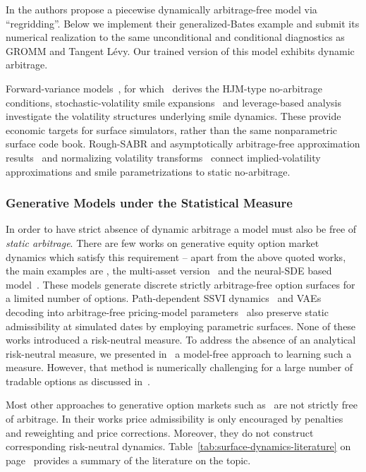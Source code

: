 \documentclass[smallextended,envcountsame,envcountsect]{svjour3}
\begin{document}
In \citet{DysLitGambaraTeichmann2021} the authors propose a piecewise
dynamically arbitrage-free model via ``regridding''.  Below we implement their
generalized-Bates example and submit its numerical realization to the same
unconditional and conditional diagnostics as GROMM and Tangent L\'evy. Our trained version of this
model exhibits dynamic arbitrage.

Forward-variance models~\citep{DysLitBergomi2005,bergomi2008smile}, for which~\citet{buehler2006consistent} derives the HJM-type no-arbitrage conditions, stochastic-volatility smile expansions~\citep{bergomi2012stochastic} and leverage-based analysis~\citep{DysLitCilibertiBouchaudPotters2008} investigate the volatility structures underlying smile dynamics. These provide economic targets for surface simulators, rather than the same nonparametric surface code book. Rough-SABR and asymptotically arbitrage-free approximation results~\citep{DysLitFukasawaGatheral2022,DysLitFukasawa2022} and normalizing volatility transforms~\citep{lucic2021normalizing} connect implied-volatility approximations and smile parametrizations to static no-arbitrage.

\subsubsection*{Generative Models under the Statistical Measure}

In order to have strict absence of dynamic arbitrage a model must also be free of \emph{static arbitrage}.
There are few works on generative equity option market dynamics which satisfy this requirement -- apart from the above quoted works, the main
examples are \citet{wiese2019simulate}, the multi-asset version~\citep{wiese2021multiassetspotoptionmarket} and
the neural-SDE based model~\citep{Cohen02012023}. These models generate
discrete strictly arbitrage-free option surfaces for a limited number of options. Path-dependent SSVI dynamics~\citep{AndresBoumezouedJourdain2023} and VAEs decoding into arbitrage-free pricing-model parameters~\citep{vae_ning2023arbitrage} also preserve static admissibility at simulated dates by employing parametric surfaces. None of these works introduced a risk-neutral measure. To address the absence of an analytical risk-neutral measure, we presented in~\citet{removedrift} a model-free approach to learning such a measure. However, that method is numerically challenging for a large number of tradable options as discussed in~\citet{DYSANOS2026}.

Most other approaches to generative option markets such as~\citep{BergeronEtAl2021,ZhangLiZhang2021,ContVuletic2023,ChoudharyJaimungalBergeron2024,VuleticCont2024,JinAgarwal2025,BrooksEtAl2026,HaoJi2026,HanEtAl2026,YangWangZhangLi2026,BucheggerGonon2026} are not strictly free of arbitrage. In their works price admissibility is only encouraged by penalties and reweighting and price corrections. Moreover, they do not construct corresponding risk-neutral dynamics. Table~\ref{tab:surface-dynamics-literature}
on page~\pageref{tab:surface-dynamics-literature} provides a summary of the literature on the topic.
\end{document}
